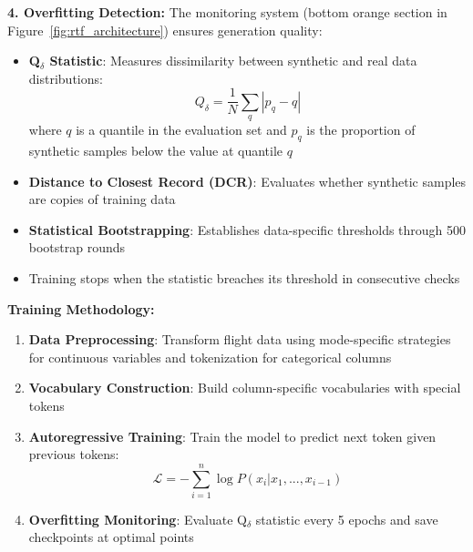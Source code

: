 \documentclass[conference]{IEEEtran}
\begin{document}
\textbf{4. Overfitting Detection:} The monitoring system (bottom orange section in Figure~\ref{fig:rtf_architecture}) ensures generation quality:
\begin{itemize}
    \item \textbf{Q$_\delta$ Statistic}: Measures dissimilarity between synthetic and real data distributions:
    \begin{equation}
    Q_\delta = \frac{1}{N}\sum_{q} |p_q - q|
    \end{equation}
    where $q$ is a quantile in the evaluation set and $p_q$ is the proportion of synthetic samples below the value at quantile $q$
    \item \textbf{Distance to Closest Record (DCR)}: Evaluates whether synthetic samples are copies of training data
    \item \textbf{Statistical Bootstrapping}: Establishes data-specific thresholds through 500 bootstrap rounds
    \item Training stops when the statistic breaches its threshold in consecutive checks
\end{itemize}

\textbf{Training Methodology:}
\begin{enumerate}
    \item \textbf{Data Preprocessing}: Transform flight data using mode-specific strategies for continuous variables and tokenization for categorical columns
    \item \textbf{Vocabulary Construction}: Build column-specific vocabularies with special tokens
    \item \textbf{Autoregressive Training}: Train the model to predict next token given previous tokens:
    \begin{equation}
    \mathcal{L} = -\sum_{i=1}^{n} \log P(x_i | x_1, ..., x_{i-1})
    \end{equation}
    \item \textbf{Overfitting Monitoring}: Evaluate Q$_\delta$ statistic every 5 epochs and save checkpoints at optimal points
\end{enumerate}
\end{document}
